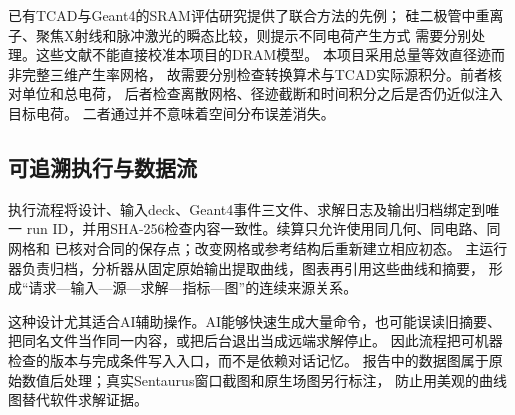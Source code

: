 已有TCAD与Geant4的SRAM评估研究提供了联合方法的先例\cite{chen2011}；
硅二极管中重离子、聚焦X射线和脉冲激光的瞬态比较，则提示不同电荷产生方式
需要分别处理\cite{ryder2021}。这些文献不能直接校准本项目的DRAM模型。
本项目采用总量等效直径迹而非完整三维产生率网格，
故需要分别检查转换算术与TCAD实际源积分。前者核对单位和总电荷，
后者检查离散网格、径迹截断和时间积分之后是否仍近似注入目标电荷。
二者通过并不意味着空间分布误差消失。

\subsection{可追溯执行与数据流}
执行流程将设计、输入deck、Geant4事件三文件、求解日志及输出归档绑定到唯一
run ID，并用SHA-256检查内容一致性。续算只允许使用同几何、同电路、同网格和
已核对合同的保存点；改变网格或参考结构后重新建立相应初态。
主运行器负责归档，分析器从固定原始输出提取曲线，图表再引用这些曲线和摘要，
形成“请求—输入—源—求解—指标—图”的连续来源关系。

这种设计尤其适合AI辅助操作。AI能够快速生成大量命令，也可能误读旧摘要、
把同名文件当作同一内容，或把后台退出当成远端求解停止。
因此流程把可机器检查的版本与完成条件写入入口，而不是依赖对话记忆。
报告中的数据图属于原始数值后处理；真实Sentaurus窗口截图和原生场图另行标注，
防止用美观的曲线图替代软件求解证据。
